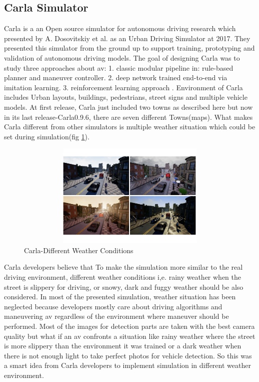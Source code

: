 \subsection{Carla Simulator}
Carla is a an Open source simulator for autonomous driving research which presented by A. Dosovitskiy et al. \cite{CarlaSimulator} as an Urban Driving Simulator at 2017. They presented this simulator from the ground up to support training, prototyping and validation of autonomous driving models. The goal of designing Carla was to study three approaches about \acrshort{av}: 1. classic modular pipeline in: rule-based planner and maneuver controller. 2. deep network trained end-to-end via imitation learning. 3. reinforcement learning approach \cite{CarlaSimulator}. Environment of Carla includes Urban layouts, buildings, pedestrians, street signs and multiple vehicle models. At first release, Carla just included two towns as described here \cite{CarlaSimulator} but now in its last release-Carla0.9.6, there are seven different Towns(maps). What makes Carla different from other simulators is multiple weather situation which could be set during simulation(fig \ref{fig:weatherSituation}).
\begin{figure}
    \centering
    \includegraphics[width=12cm, height=5cm]{images/carlaWeather.pdf}
    \caption{Carla-Different Weather Conditions}
    \label{fig:weatherSituation}
\end{figure}
Carla developers believe that To make the simulation more similar to the real driving environment, different weather conditions i,e. rainy weather when the street is slippery for driving, or snowy, dark and fuggy weather should be also considered. In most of the presented simulation, weather situation has been neglected because developers mostly care about driving algorithms and maneuvering \acrshort{av} regardless of the environment where maneuver should be performed. Most of the images for detection parts are taken with the best camera quality but what if an \acrshort{av} confronts a situation like rainy weather where the street is more slippery than the environment it was trained or a dark weather when there is not enough light to take perfect photos for vehicle detection. So this was a smart idea from Carla developers to implement simulation in different weather environment.\\
